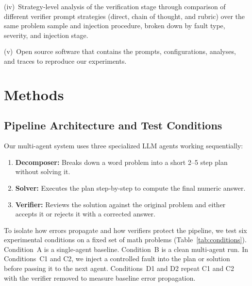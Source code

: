 \documentclass[11pt]{article}
\begin{document}
(iv)~Strategy-level analysis of the verification stage through comparison of different
verifier prompt strategies (direct, chain of thought, and rubric) over the same problem
sample and injection procedure, broken down by fault type, severity, and injection stage.

(v)~Open source software that contains the prompts, configurations, analyses, and traces to 
reproduce our experiments.

\section{Methods}

\subsection{Pipeline Architecture and Test Conditions}
Our multi-agent system uses three specialized LLM agents working sequentially:
\begin{enumerate}
    \item \textbf{Decomposer:} Breaks down a word problem into a short 2--5 step plan without solving it.
    \item \textbf{Solver:} Executes the plan step-by-step to compute the final numeric answer.
    \item \textbf{Verifier:} Reviews the solution against the original problem and either accepts it or rejects it with a corrected answer.
\end{enumerate}

To isolate how errors propagate and how verifiers protect the pipeline, we test six experimental conditions on a fixed set of math problems (Table~\ref{tab:conditions}). Condition~A is a single-agent baseline. Condition~B is a clean multi-agent run. In Conditions~C1 and C2, we inject a controlled fault into the plan or solution before passing it to the next agent. Conditions~D1 and D2 repeat C1 and C2 with the verifier removed to measure baseline error propagation.
\end{document}
